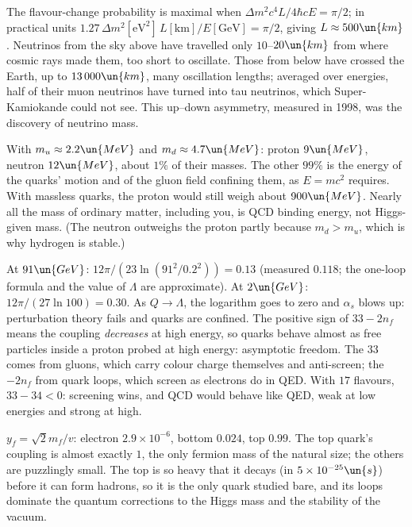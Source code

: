  The flavour-change probability is maximal when $\Delta m^2c^4L/4\hbar cE = \pi/2$; in practical units $1.27\,\Delta m^2[\mathrm{eV^2}]\,L[\mathrm{km}]/E[\mathrm{GeV}] = \pi/2$, giving $L\approx500\un{km}$. Neutrinos from the sky above have travelled only $10$--$20\un{km}$ from where cosmic rays made them, too short to oscillate. Those from below have crossed the Earth, up to $13\,000\un{km}$, many oscillation lengths; averaged over energies, half of their muon neutrinos have turned into tau neutrinos, which Super-Kamiokande could not see. This up--down asymmetry, measured in 1998, was the discovery of neutrino mass.

 With $m_u\approx2.2\un{MeV}$ and $m_d\approx4.7\un{MeV}$: proton $9\un{MeV}$, neutron $12\un{MeV}$, about $1\%$ of their masses. The other $99\%$ is the energy of the quarks' motion and of the gluon field confining them, as $E = mc^2$ requires. With massless quarks, the proton would still weigh about $900\un{MeV}$. Nearly all the mass of ordinary matter, including you, is QCD binding energy, not Higgs-given mass. (The neutron outweighs the proton partly because $m_d>m_u$, which is why hydrogen is stable.)

 At $91\un{GeV}$: $12\pi/(23\ln(91^2/0.2^2)) = 0.13$ (measured $0.118$; the one-loop formula and the value of $\Lambda$ are approximate). At $2\un{GeV}$: $12\pi/(27\ln100) = 0.30$. As $Q\to\Lambda$, the logarithm goes to zero and $\alpha_s$ blows up: perturbation theory fails and quarks are confined. The positive sign of $33-2n_f$ means the coupling \emph{decreases} at high energy, so quarks behave almost as free particles inside a proton probed at high energy: asymptotic freedom. The $33$ comes from gluons, which carry colour charge themselves and anti-screen; the $-2n_f$ from quark loops, which screen as electrons do in QED. With $17$ flavours, $33 - 34<0$: screening wins, and QCD would behave like QED, weak at low energies and strong at high.

 $y_f = \sqrt2m_f/v$: electron $2.9\times10^{-6}$, bottom $0.024$, top $0.99$. The top quark's coupling is almost exactly $1$, the only fermion mass of the natural size; the others are puzzlingly small. The top is so heavy that it decays (in $5\times10^{-25}\un{s}$) before it can form hadrons, so it is the only quark studied bare, and its loops dominate the quantum corrections to the Higgs mass and the stability of the vacuum.

